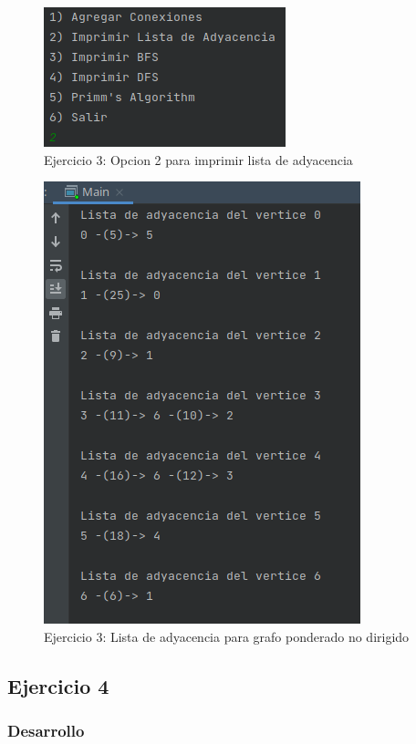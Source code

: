 \documentclass{article}
\begin{document}
			\begin{figure}[H]
				\centering
				\includegraphics[scale= 1]{images/e39.png}
				\caption*{Ejercicio 3: Opcion 2 para imprimir lista de adyacencia}
			\end{figure}
			
			\begin{figure}[H]
				\centering
				\includegraphics[scale= 1]{images/e310.png}
				\caption*{Ejercicio 3: Lista de adyacencia para grafo ponderado no dirigido}
			\end{figure}
			
		\newpage	
			
		\subsection{Ejercicio 4}
			
			\subsubsection{Desarrollo}
			
\end{document}
